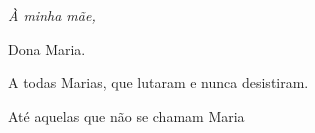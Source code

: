 \thispagestyle{empty}
\begin{center}
    \vspace*{0.30\textheight}

    {\large\itshape
    À minha mãe,\par
    Dona Maria.\par}

    \vspace{12pt}

    {\normalsize
    A todas Marias, que lutaram e nunca desistiram. 
    
    Até aquelas que não se chamam Maria\par}
\end{center}

\cleardoublepage
